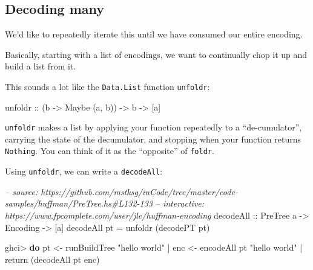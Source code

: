 \documentclass[]{article}
\newenvironment{Shaded}{\begin{snugshade}}{\end{snugshade}}
\newcommand{\CommentTok}[1]{\textcolor[rgb]{0.56,0.35,0.01}{\textit{#1}}}
\newcommand{\DataTypeTok}[1]{\textcolor[rgb]{0.13,0.29,0.53}{#1}}
\newcommand{\FunctionTok}[1]{\textcolor[rgb]{0.00,0.00,0.00}{#1}}
\newcommand{\KeywordTok}[1]{\textcolor[rgb]{0.13,0.29,0.53}{\textbf{#1}}}
\newcommand{\NormalTok}[1]{#1}
\newcommand{\OtherTok}[1]{\textcolor[rgb]{0.56,0.35,0.01}{#1}}
\newcommand{\StringTok}[1]{\textcolor[rgb]{0.31,0.60,0.02}{#1}}
\begin{document}
\hypertarget{decoding-many}{%
\subsection{Decoding many}\label{decoding-many}}

We'd like to repeatedly iterate this until we have consumed our entire encoding.

Basically, starting with a list of encodings, we want to continually chop it up
and build a list from it.

This sounds a lot like the \texttt{Data.List} function \texttt{unfoldr}:

\begin{Shaded}
\begin{Highlighting}[]
\OtherTok{unfoldr ::}\NormalTok{ (b }\OtherTok{->} \DataTypeTok{Maybe}\NormalTok{ (a, b)) }\OtherTok{->}\NormalTok{ b }\OtherTok{->}\NormalTok{ [a]}
\end{Highlighting}
\end{Shaded}

\texttt{unfoldr} makes a list by applying your function repeatedly to a
``de-cumulator'', carrying the state of the decumulator, and stopping when your
function returns \texttt{Nothing}. You can think of it as the ``opposite'' of
\texttt{foldr}.

Using \texttt{unfoldr}, we can write a \texttt{decodeAll}:

\begin{Shaded}
\begin{Highlighting}[]
\CommentTok{-- source: https://github.com/mstksg/inCode/tree/master/code-samples/huffman/PreTree.hs#L132-133}
\CommentTok{-- interactive: https://www.fpcomplete.com/user/jle/huffman-encoding}
\OtherTok{decodeAll ::} \DataTypeTok{PreTree}\NormalTok{ a }\OtherTok{->} \DataTypeTok{Encoding} \OtherTok{->}\NormalTok{ [a]}
\NormalTok{decodeAll pt }\FunctionTok{=}\NormalTok{ unfoldr (decodePT pt)}
\end{Highlighting}
\end{Shaded}

\begin{Shaded}
\begin{Highlighting}[]
\NormalTok{ghci}\FunctionTok{>} \KeywordTok{do}\NormalTok{ pt  }\OtherTok{<-}\NormalTok{ runBuildTree }\StringTok{"hello world"}
 \FunctionTok{|}\NormalTok{    enc }\OtherTok{<-}\NormalTok{ encodeAll pt }\StringTok{"hello world"}
 \FunctionTok{|}\NormalTok{    return (decodeAll pt enc)}
\end{Highlighting}
\end{Shaded}
\end{document}
